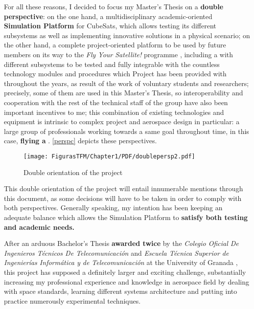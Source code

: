 For all these reasons, I decided to focus my Master's Thesis on a \textbf{double perspective}: on the one hand, a multidisciplinary academic-oriented \textbf{Simulation Platform} for CubeSats, which allows testing its different subsystems as well as implementing innovative solutions in a physical scenario; on the other hand, a complete project-oriented platform to be used by future  members	on its way to the \textit{Fly Your Satellite!} programme \cite{flyyour}, including a   with different subsystems to be tested and fully integrable with the countless technology modules and procedures which  Project has been provided with throughout the years, as result of the work of voluntary students and researchers; precisely, some of them are used in this Master's Thesis, so interoperability and cooperation with the rest of the technical staff of the group have also been important incentives to me; this combination of existing technologies and equipment is intrinsic to complex project and aerospace design in particular: a large group of professionals working towards a same goal throughout time, in this case, \textbf{flying a }. \autoref{perspc} depicts these perspectives.


			\begin{figure}[H]
			\centering
			\texttt{[image: FigurasTFM/Chapter1/PDF/doublepersp2.pdf]}
			\caption{Double orientation of the project} \label{perspc}
			\end{figure}


This double orientation of the project will entail innumerable mentions through this document, as some decisions will have to be taken in order to comply with both perspectives. Generally speaking, my intention has been keeping an adequate balance which allows the Simulation Platform to \textbf{satisfy both testing and academic needs.}

After an arduous Bachelor's Thesis \cite{tfg} \textbf{awarded twice} by the \textit{Colegio Oficial De Ingenieros Técnicos De Telecomunicación} \cite{coitt} and \textit{Escuela Técnica Superior de Ingenierías Informática y de Telecomunicación} at the University of Granada \cite{etsiit}, this project has supposed a definitely larger and exciting challenge, substantially increasing my professional experience and knowledge in aerospace field by dealing with space standards, learning different systems architecture and putting into practice numerously experimental techniques.

